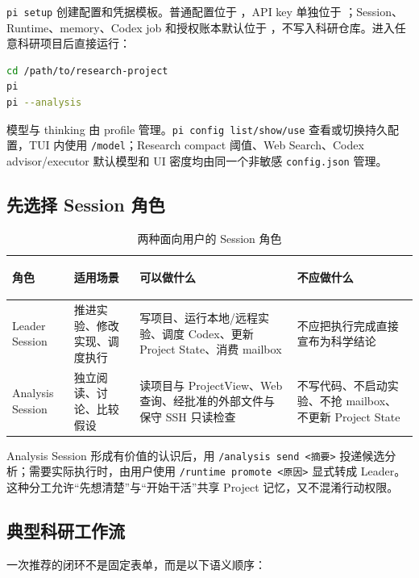 \documentclass[UTF8,11pt,a4paper,fontset=fandol]{ctexart}
\newcommand{\code}[1]{\texttt{#1}}
\begin{document}
\code{pi setup} 创建配置和凭据模板。普通配置位于 ，API key 单独位于 ；Session、Runtime、memory、Codex job 和授权账本默认位于 ，不写入科研仓库。进入任意科研项目后直接运行：

\begin{lstlisting}[language=bash]
cd /path/to/research-project
pi
pi --analysis
\end{lstlisting}

模型与 thinking 由 profile 管理。\code{pi config list/show/use} 查看或切换持久配置，TUI 内使用 \code{/model}；Research compact 阈值、Web Search、Codex advisor/executor 默认模型和 UI 密度均由同一个非敏感 \code{config.json} 管理。

\subsection{先选择 Session 角色}

\begin{table}[H]
  \centering
  \caption{两种面向用户的 Session 角色}
  \small
  \begin{tabularx}{\textwidth}{>{\bfseries\raggedright\arraybackslash}p{2.8cm}YYY}
    \toprule
    角色 & 适用场景 & 可以做什么 & 不应做什么 \\
    \midrule
    Leader Session & 推进实验、修改实现、调度执行 & 写项目、运行本地/远程实验、调度 Codex、更新 Project State、消费 mailbox & 不应把执行完成直接宣布为科学结论 \\
    Analysis Session & 独立阅读、讨论、比较假设 & 读项目与 ProjectView、Web 查询、经批准的外部文件与保守 SSH 只读检查 & 不写代码、不启动实验、不抢 mailbox、不更新 Project State \\
    \bottomrule
  \end{tabularx}
\end{table}

Analysis Session 形成有价值的认识后，用 \code{/analysis send <摘要>} 投递候选分析；需要实际执行时，由用户使用 \code{/runtime promote <原因>} 显式转成 Leader。这种分工允许“先想清楚”与“开始干活”共享 Project 记忆，又不混淆行动权限。

\subsection{典型科研工作流}

一次推荐的闭环不是固定表单，而是以下语义顺序：
\end{document}
